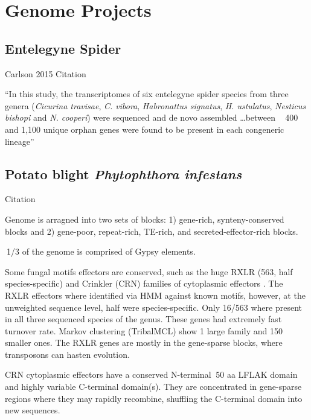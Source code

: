 \section{Genome Projects}
\subsection{Entelegyne Spider}

  Carlson 2015 Citation \cite{carlson_novo_2015}

  ``In this study, the transcriptomes of six entelegyne spider species from
  three genera (\textit{Cicurina travisae}, \textit{C. vibora},
  \textit{Habronattus signatus}, \textit{H. ustulatus}, \textit{Nesticus
    bishopi} and \textit{N.  cooperi}) were sequenced and de novo assembled
  \dots between ~ 400 and 1,100 unique orphan genes were found to be present in
  each congeneric lineage''


\subsection{Potato blight \textit{Phytophthora infestans}}

  Citation \cite{haas_genome_2009}

  Genome is arragned into two sets of blocks: 1) gene-rich, synteny-conserved
  blocks and 2) gene-poor, repeat-rich, TE-rich, and secreted-effector-rich
  blocks.

  $~$1/3 of the genome is comprised of Gypsy elements.

  Some fungal motifs effectors are conserved, such as the huge RXLR (563, half
  species-specific) and Crinkler (CRN) families of cytoplasmic effectors
  \cite{haas_genome_2009}. The RXLR effectors where identified via HMM against
  known motifs, however, at the unweighted sequence level, half were
  species-specific. Only 16/563 where present in all three sequenced species of
  the genus. These genes had extremely fast turnover rate. Markov clustering
  (TribalMCL) show 1 large family and 150 smaller ones. The RXLR genes are
  mostly in the gene-sparse blocks, where transposons can hasten evolution.

  CRN cytoplasmic effectors have a conserved N-terminal $~$50 aa LFLAK domain
  and highly variable C-terminal domain(s). They are concentrated in
  gene-sparse regions where they may rapidly recombine, shuffling the
  C-terminal domain into new sequences.

